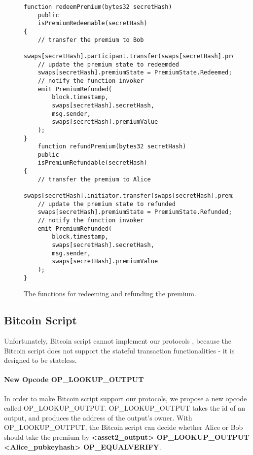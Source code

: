 \begin{figure}
\begin{lstlisting}[language=Solidity, basicstyle=\tiny]
function redeemPremium(bytes32 secretHash)
    public
    isPremiumRedeemable(secretHash)
{
    // transfer the premium to Bob
    swaps[secretHash].participant.transfer(swaps[secretHash].premiumValue);
    // update the premium state to redeemded
    swaps[secretHash].premiumState = PremiumState.Redeemed;
    // notify the function invoker
    emit PremiumRefunded(
        block.timestamp,
        swaps[secretHash].secretHash,
        msg.sender,
        swaps[secretHash].premiumValue
    );
}
    function refundPremium(bytes32 secretHash)
    public
    isPremiumRefundable(secretHash)
{
    // transfer the premium to Alice
    swaps[secretHash].initiator.transfer(swaps[secretHash].premiumValue);
    // update the premium state to refunded
    swaps[secretHash].premiumState = PremiumState.Refunded;
    // notify the function invoker
    emit PremiumRefunded(
        block.timestamp,
        swaps[secretHash].secretHash,
        msg.sender,
        swaps[secretHash].premiumValue
    );
}
\end{lstlisting}
\label{code:premium_redeem_refund_function}
\caption{The functions for redeeming and refunding the premium.}
\end{figure}


\subsection{Bitcoin Script}

Unfortunately, Bitcoin script cannot implement our protocols , because the Bitcoin script does not support the stateful transaction functionalities - it is designed to be stateless. 

\paragraph{New Opcode OP\_LOOKUP\_OUTPUT}
In order to make Bitcoin script support our protocols, we propose a new opcode called OP\_LOOKUP\_OUTPUT.
OP\_LOOKUP\_OUTPUT takes the id of an output, and produces the address of the output's owner.
With OP\_LOOKUP\_OUTPUT, the Bitcoin script can decide whether Alice or Bob should take the premium by \textbf{<asset2\_output> OP\_LOOKUP\_OUTPUT <Alice\_pubkeyhash> OP\_EQUALVERIFY}. 

